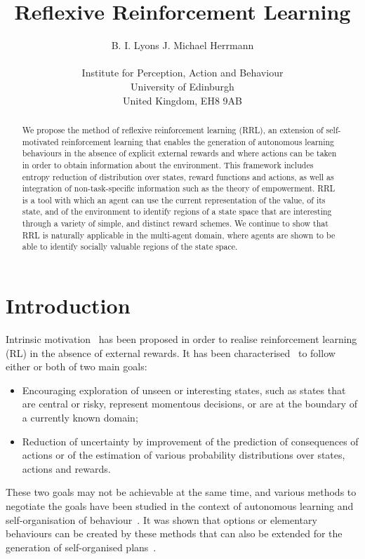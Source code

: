 \documentclass{article}
\title{Reflexive Reinforcement Learning}
\author{
  B. I. Lyons \quad J. Michael Herrmann \\
  \\
  Institute for Perception, Action and Behaviour\\
  University of Edinburgh\\
  United Kingdom, EH8 9AB \\
}
\begin{document}
\maketitle

\begin{abstract}
We propose the method of reflexive reinforcement learning (RRL), an extension of self-motivated reinforcement learning that enables the generation of autonomous learning behaviours in the absence of explicit external rewards and where actions can be taken in order to obtain information about the environment. This framework includes entropy reduction of distribution over states, reward functions and actions, as well as integration of non-task-specific information such as the theory of empowerment. RRL is a tool with which an agent can use the current representation of the value, of its state, and of the environment to identify regions of a state space that are interesting through a variety of simple, and distinct reward schemes. We continue to show that RRL is naturally applicable in the multi-agent domain, where agents are shown to be able to identify socially valuable regions of the state space.%
%
\end{abstract}

\section{Introduction}

Intrinsic motivation~\cite{chentanez2005intrinsically} has been proposed in order to realise 
reinforcement learning (RL) in the absence of external rewards. It has been 
characterised~\cite{pathak2017curiosity} to follow either or both of two main goals:
\begin{itemize}
	\item Encouraging exploration of unseen or interesting states, such as states that
		are central or risky, represent momentous decisions, or are at the 
		boundary of a currently known domain;
	\item Reduction of uncertainty by improvement of the prediction of consequences of 
		actions or of the estimation of various probability distributions over
		states, actions and rewards.
\end{itemize}
These two goals may not be achievable at the same time, and various methods to negotiate the
goals have been studied in the context of autonomous learning and self-organisation 
of behaviour~\cite{bialek1999predictive,der2012playful,klyubin2005empowerment}.
It was shown that options or elementary behaviours can be created by these methods that can 
also be extended for the generation of self-organised plans~\cite{blaes2019control}. 
\end{document}
